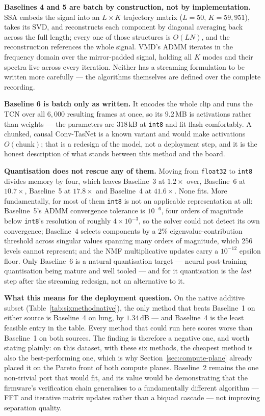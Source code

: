 \documentclass[11pt]{article}
\begin{document}
\textbf{Baselines 4 and 5 are batch by construction, not by implementation.}
SSA embeds the signal into an $L \times K$ trajectory matrix ($L{=}50$,
$K{=}59{,}951$), takes its SVD, and reconstructs each component by diagonal
averaging back across the full length; every one of those structures is
$O(LN)$, and the reconstruction references the whole signal. VMD's ADMM
iterates in the frequency domain over the mirror-padded signal, holding all
$K$ modes and their spectra live across every iteration. Neither has a
streaming formulation to be written more carefully --- the algorithms
themselves are defined over the complete recording.

\textbf{Baseline 6 is batch only as written.} It encodes the whole clip and
runs the TCN over all $6{,}000$ resulting frames at once, so its $9.2$\,MB is
activations rather than weights --- the parameters are $318$\,kB at
\texttt{int8} and fit flash comfortably. A chunked, causal Conv-TasNet is a
known variant and would make activations $O(\text{chunk})$; that is a
redesign of the model, not a deployment step, and it is the honest description
of what stands between this method and the board.

\textbf{Quantisation does not rescue any of them.} Moving from
\texttt{float32} to \texttt{int8} divides memory by four, which leaves
Baseline~3 at $1.2\times$ over, Baseline~6 at $10.7\times$, Baseline~5 at
$17.8\times$ and Baseline~4 at $41.6\times$. None fits. More fundamentally,
for most of them \texttt{int8} is not an applicable representation at all:
Baseline~5's ADMM convergence tolerance is $10^{-6}$, four orders of magnitude
below \texttt{int8}'s resolution of roughly $4 \times 10^{-3}$, so the solver
could not detect its own convergence; Baseline~4 selects components by a
$2\%$ eigenvalue-contribution threshold across singular values spanning many
orders of magnitude, which 256 levels cannot represent; and the NMF
multiplicative updates carry a $10^{-12}$ epsilon floor. Only Baseline~6 is a
natural quantisation target --- neural post-training quantisation being
mature and well tooled --- and for it quantisation is the \emph{last} step
after the streaming redesign, not an alternative to it.

\textbf{What this means for the deployment question.} On the native additive
subset (Table~\ref{tab:sixmethodnative}), the only method that beats
Baseline~1 on either source is Baseline~4 on lung, by $1.34$\,dB --- and
Baseline~4 is the least feasible entry in the table. Every method that could
run here scores worse than Baseline~1 on both sources. The finding is
therefore a negative one, and worth stating plainly: on this dataset, with
these six methods, the cheapest method is also the best-performing one, which
is why Section~\ref{sec:compute-plane} already placed it on the Pareto front
of both compute planes. Baseline~2 remains the one non-trivial port that
would fit, and its value would be demonstrating that the firmware's
verification chain generalises to a fundamentally different algorithm ---
FFT and iterative matrix updates rather than a biquad cascade --- not
improving separation quality.
\end{document}
